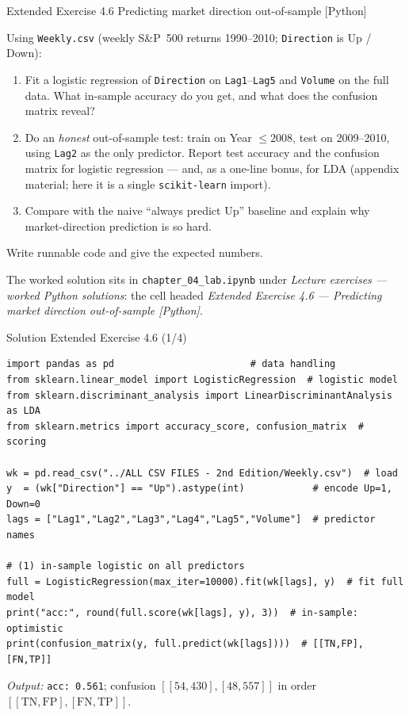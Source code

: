 \documentclass[aspectratio=169,11pt]{beamer}
\begin{document}
\begin{frame}{Extended Exercise 4.6 \textemdash{} Predicting market direction out-of-sample [Python]}
\begin{longexercise}
Using \texttt{Weekly.csv} (weekly S\&P~500 returns 1990--2010;
\texttt{Direction} is Up / Down):
\begin{enumerate}
  \item Fit a logistic regression of \texttt{Direction} on
        \texttt{Lag1}--\texttt{Lag5} and \texttt{Volume} on the full data.
        What in-sample accuracy do you get, and what does the confusion
        matrix reveal?
  \item Do an \emph{honest} out-of-sample test: train on
        Year $\le 2008$, test on 2009--2010, using \texttt{Lag2} as the
        only predictor. Report test accuracy and the confusion matrix for
        logistic regression --- and, as a one-line bonus, for LDA
        (appendix material; here it is a single \texttt{scikit-learn} import).
  \item Compare with the naive ``always predict Up'' baseline and explain
        why market-direction prediction is so hard.
\end{enumerate}
Write runnable code and give the expected numbers.
\end{longexercise}
\begin{labnote}
  The worked solution sits in \texttt{chapter\_04\_lab.ipynb} under \emph{Lecture
  exercises --- worked Python solutions}: the cell headed \emph{Extended Exercise
  4.6 --- Predicting market direction out-of-sample [Python]}.
\end{labnote}
\end{frame}

\begin{frame}[fragile]{Solution \textemdash{} Extended Exercise 4.6 (1/4)}
\begin{solutionbox}
\begin{lstlisting}
import pandas as pd                        # data handling
from sklearn.linear_model import LogisticRegression  # logistic model
from sklearn.discriminant_analysis import LinearDiscriminantAnalysis as LDA
from sklearn.metrics import accuracy_score, confusion_matrix  # scoring

wk = pd.read_csv("../ALL CSV FILES - 2nd Edition/Weekly.csv")  # load
y  = (wk["Direction"] == "Up").astype(int)            # encode Up=1, Down=0
lags = ["Lag1","Lag2","Lag3","Lag4","Lag5","Volume"]  # predictor names

# (1) in-sample logistic on all predictors
full = LogisticRegression(max_iter=10000).fit(wk[lags], y)  # fit full model
print("acc:", round(full.score(wk[lags], y), 3))  # in-sample: optimistic
print(confusion_matrix(y, full.predict(wk[lags])))  # [[TN,FP],[FN,TP]]
\end{lstlisting}
\emph{Output:} \texttt{acc: 0.561}; confusion
$[[54,430],[48,557]]$ in order $[[\mathrm{TN},\mathrm{FP}],[\mathrm{FN},\mathrm{TP}]]$.
\end{solutionbox}
\end{frame}
\end{document}
